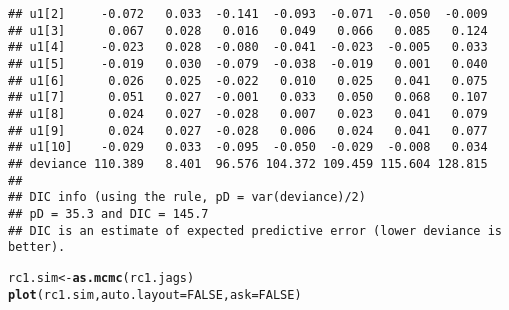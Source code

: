 \documentclass[12pt,letterpaper,oneside]{article}\usepackage{graphicx, color}
\makeatletter
\newcommand{\hlfunctioncall}[1]{\textcolor[rgb]{0.501960784313725,0,0.329411764705882}{\textbf{#1}}}%
\newenvironment{kframe}{%
 \def\at@end@of@kframe{}%
 \ifinner\ifhmode%
  \def\at@end@of@kframe{\end{minipage}}%
  \begin{minipage}{\columnwidth}%
 \fi\fi%
 \def\FrameCommand##1{\hskip\@totalleftmargin \hskip-\fboxsep
 \colorbox{shadecolor}{##1}\hskip-\fboxsep
     \hskip-\linewidth \hskip-\@totalleftmargin \hskip\columnwidth}%
 \MakeFramed {\advance\hsize-\width
   \@totalleftmargin\z@ \linewidth\hsize
   \@setminipage}}%
 {\par\unskip\endMakeFramed%
 \at@end@of@kframe}
\newenvironment{knitrout}{}{} %
\makeatother
\begin{document}
\begin{knitrout}
\begin{kframe}
\begin{verbatim}
## u1[2]     -0.072   0.033  -0.141  -0.093  -0.071  -0.050  -0.009
## u1[3]      0.067   0.028   0.016   0.049   0.066   0.085   0.124
## u1[4]     -0.023   0.028  -0.080  -0.041  -0.023  -0.005   0.033
## u1[5]     -0.019   0.030  -0.079  -0.038  -0.019   0.001   0.040
## u1[6]      0.026   0.025  -0.022   0.010   0.025   0.041   0.075
## u1[7]      0.051   0.027  -0.001   0.033   0.050   0.068   0.107
## u1[8]      0.024   0.027  -0.028   0.007   0.023   0.041   0.079
## u1[9]      0.024   0.027  -0.028   0.006   0.024   0.041   0.077
## u1[10]    -0.029   0.033  -0.095  -0.050  -0.029  -0.008   0.034
## deviance 110.389   8.401  96.576 104.372 109.459 115.604 128.815
## 
## DIC info (using the rule, pD = var(deviance)/2)
## pD = 35.3 and DIC = 145.7
## DIC is an estimate of expected predictive error (lower deviance is better).
\end{verbatim}
\begin{alltt}
rc1.sim <- \hlfunctioncall{as.mcmc}(rc1.jags)
\hlfunctioncall{plot}(rc1.sim, auto.layout = FALSE, ask = FALSE)
\end{alltt}
\end{kframe}


\end{knitrout}
\end{document}
